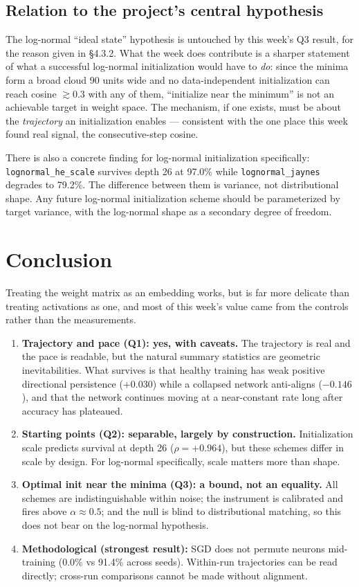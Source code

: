 \documentclass[11pt]{article}
\begin{document}
\subsection{Relation to the project's central hypothesis}

The log-normal ``ideal state'' hypothesis is untouched by this week's Q3 result, for the reason
given in \S4.3.2. What the week does contribute is a sharper statement of what a successful
log-normal initialization would have to \emph{do}: since the minima form a broad cloud 90 units
wide and no data-independent initialization can reach cosine $\gtrsim0.3$ with any of them,
``initialize near the minimum'' is not an achievable target in weight space. The mechanism, if
one exists, must be about the \emph{trajectory} an initialization enables --- consistent with the
one place this week found real signal, the consecutive-step cosine.

There is also a concrete finding for log-normal initialization specifically:
\texttt{lognormal\_he\_scale} survives depth 26 at 97.0\% while \texttt{lognormal\_jaynes}
degrades to 79.2\%. The difference between them is variance, not distributional shape. Any future
log-normal initialization scheme should be parameterized by target variance, with the log-normal
shape as a secondary degree of freedom.

\section{Conclusion}

Treating the weight matrix as an embedding works, but is far more delicate than treating
activations as one, and most of this week's value came from the controls rather than the
measurements.

\begin{enumerate}
\item \textbf{Trajectory and pace (Q1): yes, with caveats.} The trajectory is real and the pace
is readable, but the natural summary statistics are geometric inevitabilities. What survives is
that healthy training has weak positive directional persistence ($+0.030$) while a collapsed
network anti-aligns ($-0.146$), and that the network continues moving at a near-constant rate long
after accuracy has plateaued.
\item \textbf{Starting points (Q2): separable, largely by construction.} Initialization scale
predicts survival at depth 26 ($\rho = +0.964$), but these schemes differ in scale by design. For
log-normal specifically, scale matters more than shape.
\item \textbf{Optimal init near the minima (Q3): a bound, not an equality.} All schemes are
indistinguishable within noise; the instrument is calibrated and fires above $\alpha\approx0.5$;
and the null is blind to distributional matching, so this does not bear on the log-normal
hypothesis.
\item \textbf{Methodological (strongest result):} SGD does not permute neurons mid-training
(0.0\% vs 91.4\% across seeds). Within-run trajectories can be read directly; cross-run
comparisons cannot be made without alignment.
\end{enumerate}
\end{document}
